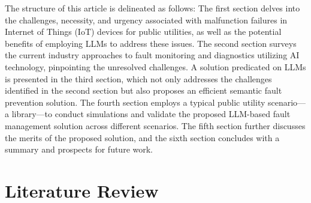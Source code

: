 \documentclass[preprint,12pt]{elsarticle}
\begin{document}
The structure of this article is delineated as follows: The first section delves into the challenges, necessity, and urgency associated with malfunction failures in Internet of Things (IoT) devices for public utilities, as well as the potential benefits of employing LLMs to address these issues. The second section surveys the current industry approaches to fault monitoring and diagnostics utilizing AI technology, pinpointing the unresolved challenges. A solution predicated on LLMs is presented in the third section, which not only addresses the challenges identified in the second section but also proposes an efficient semantic fault prevention solution. The fourth section employs a typical public utility scenario—a library—to conduct simulations and validate the proposed LLM-based fault management solution across different scenarios. The fifth section further discusses the merits of the proposed solution, and the sixth section concludes with a summary and prospects for future work.

\section{Literature Review}
\end{document}
